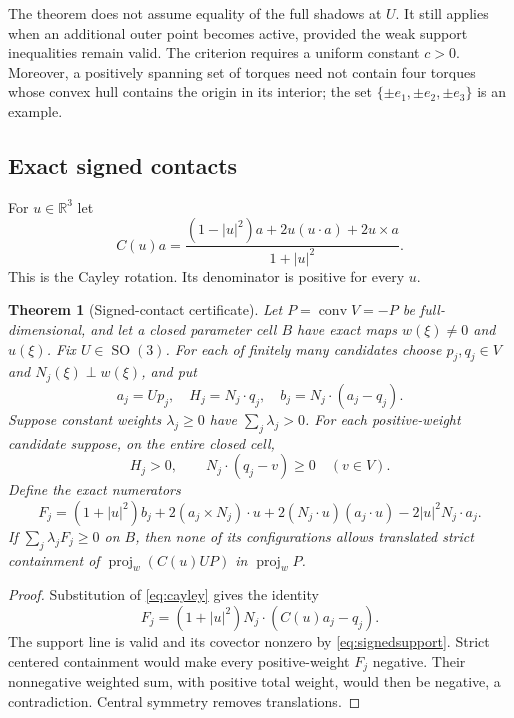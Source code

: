 \documentclass[11pt]{amsart}
\newcommand{\R}{\mathbb R}
\newcommand{\SO}{\operatorname{SO}}
\newcommand{\conv}{\operatorname{conv}}
\newcommand{\proj}{\operatorname{proj}}
\newtheorem{theorem}{Theorem}[section]
\theoremstyle{definition}
\theoremstyle{remark}
\begin{document}
The theorem does not assume equality of the full shadows at $U$. It still
applies when an additional outer point becomes active, provided the weak
support inequalities remain valid. The criterion requires a uniform
constant $c>0$. Moreover, a positively spanning set of torques need not
contain four torques whose convex hull contains the origin in its
interior; the set $\{\pm e_1,\pm e_2,\pm e_3\}$ is an example.

\subsection{Exact signed contacts}
For $u\in\R^3$ let
\begin{equation}\label{eq:cayley}
 C(u)a=\frac{(1-|u|^2)a+2u(u\cdot a)+2u\times a}{1+|u|^2}.
\end{equation}
This is the Cayley rotation. Its denominator is positive for every $u$.

\begin{theorem}[Signed-contact certificate]\label{thm:signed}
Let $P=\conv V=-P$ be full-dimensional, and let a closed parameter cell
$B$ have exact maps $w(\xi)\ne0$ and $u(\xi)$. Fix $U\in\SO(3)$.
For each of finitely many candidates choose $p_j,q_j\in V$ and
$N_j(\xi)\perp w(\xi)$, and put
\[
 a_j=Up_j,\quad H_j=N_j\cdot q_j,\quad b_j=N_j\cdot(a_j-q_j).
\]
Suppose constant weights $\lambda_j\ge0$ have $\sum_j\lambda_j>0$.
For each positive-weight candidate suppose, on the entire closed cell,
\begin{equation}\label{eq:signedsupport}
 H_j>0,\qquad N_j\cdot(q_j-v)\ge0\quad(v\in V).
\end{equation}
Define the exact numerators
\begin{equation}\label{eq:signedF}
 F_j=(1+|u|^2)b_j+2(a_j\times N_j)\cdot u
       +2(N_j\cdot u)(a_j\cdot u)-2|u|^2N_j\cdot a_j.
\end{equation}
If $\sum_j\lambda_jF_j\ge0$ on $B$, then none of its configurations
allows translated strict containment of $\proj_w(C(u)UP)$ in
$\proj_wP$.
\end{theorem}
\begin{proof}
Substitution of \eqref{eq:cayley} gives the identity
\[
 F_j=(1+|u|^2)N_j\cdot(C(u)a_j-q_j).
\]
The support line is valid and its covector nonzero by
\eqref{eq:signedsupport}. Strict centered containment would make every
positive-weight $F_j$ negative. Their nonnegative weighted sum, with
positive total weight, would then be negative, a contradiction.
Central symmetry removes translations.
\end{proof}
\end{document}
